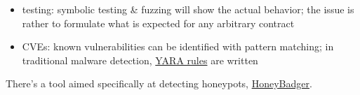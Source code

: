 \begin{itemize}
\item{testing: symbolic testing \& fuzzing will show the actual behavior; the issue is rather to formulate what is expected for any arbitrary contract}
\item{CVEs: known vulnerabilities can be identified with pattern matching; in traditional malware detection, \href{https://yara.readthedocs.io/en/stable/writingrules.html}{YARA rules} are written}
\end{itemize}

There's a tool aimed specifically at detecting honeypots, \href{https://github.com/christoftorres/HoneyBadger}{HoneyBadger}.
